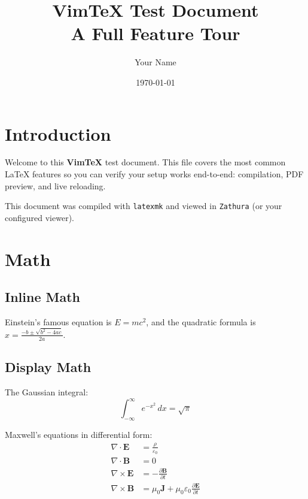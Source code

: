 \documentclass[12pt, a4paper]{article}
\title{\textbf{VimTeX Test Document} \\ \large A Full Feature Tour}
\author{Your Name}
\date{\today}
\begin{document}

\maketitle
\tableofcontents
\newpage

\section{Introduction}

Welcome to this \textbf{VimTeX} test document. This file covers the most
common \LaTeX{} features so you can verify your setup works end-to-end:
compilation, PDF preview, and live reloading.

This document was compiled with \texttt{latexmk} and viewed in
\texttt{Zathura} (or your configured viewer).

\section{Math}
\label{sec:math}

\subsection{Inline Math}

Einstein's famous equation is $E = mc^2$, and the quadratic formula is
$x = \frac{-b \pm \sqrt{b^2 - 4ac}}{2a}$.

\subsection{Display Math}

The Gaussian integral:
\[
	\int_{-\infty}^{\infty} e^{-x^2} \, dx = \sqrt{\pi}
\]

Maxwell's equations in differential form:
\begin{align}
	\nabla \cdot \mathbf{E}  & = \frac{\rho}{\varepsilon_0}              \\
	\nabla \cdot \mathbf{B}  & = 0                                       \\
	\nabla \times \mathbf{E} & = -\frac{\partial \mathbf{B}}{\partial t} \\
	\nabla \times \mathbf{B} & = \mu_0 \mathbf{J}
	+ \mu_0 \varepsilon_0 \frac{\partial \mathbf{E}}{\partial t}
\end{align}
\end{document}
